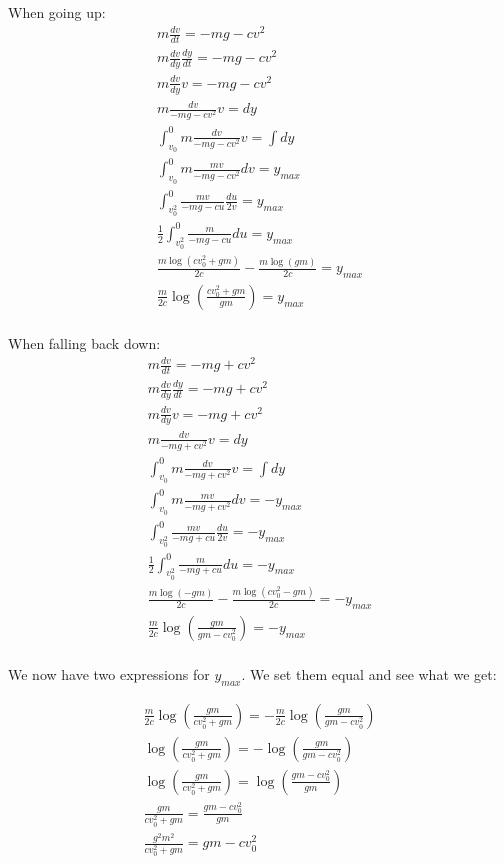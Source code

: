 \documentclass[10pt]{article} %
\begin{document}
When going up:\\
\begin{align}
  m\frac{dv}{dt} = -mg - cv^2\\
  m\frac{dv}{dy}\frac{dy}{dt} = -mg - cv^2\\
  m\frac{dv}{dy}v = -mg - cv^2\\
  m\frac{dv}{-mg - cv^2}v = dy\\
  \int_{v_0}^0 m\frac{dv}{-mg - cv^2}v = \int dy\\
  \int_{v_0}^0 m\frac{mv}{-mg - cv^2}dv = y_{max}\\
  \int_{v_0^2}^0 \frac{mv}{-mg - cu}\frac{du}{2v} = y_{max}\\
  \frac{1}{2} \int_{v_0^2}^0 \frac{m}{-mg - cu} du = y_{max}\\
  \frac{m \log(cv_0^2 + gm)}{2c} - \frac{m \log(gm)}{2c} = y_{max}\\
  \frac{m}{2c} \log(\frac{cv_0^2 + gm}{gm}) = y_{max}\\  
\end{align}


When falling back down:\\
\begin{align}
  m\frac{dv}{dt} = -mg + cv^2\\
  m\frac{dv}{dy}\frac{dy}{dt} = -mg + cv^2\\
  m\frac{dv}{dy}v = -mg + cv^2\\
  m\frac{dv}{-mg + cv^2}v = dy\\
  \int_{v_0}^0 m\frac{dv}{-mg + cv^2}v = \int dy\\
  \int_{v_0}^0 m\frac{mv}{-mg + cv^2}dv = -y_{max}\\
  \int_{v_0^2}^0 \frac{mv}{-mg + cu}\frac{du}{2v} = -y_{max}\\
  \frac{1}{2} \int_{v_0^2}^0 \frac{m}{-mg + cu} du = -y_{max}\\
  \frac{m \log(-gm)}{2c} - \frac{m \log(cv_0^2 - gm)}{2c} = -y_{max}\\
  \frac{m}{2c} \log(\frac{gm}{gm - cv_0^2}) = -y_{max}\\
\end{align}

We now have two expressions for $y_{max}$. We set them equal and see what we get:

\begin{align}
  \frac{m}{2c} \log(\frac{gm}{cv_0^2 + gm}) = -\frac{m}{2c} \log(\frac{gm}{gm - cv_0^2})\\
  \log(\frac{gm}{cv_0^2 + gm}) = -\log(\frac{gm}{gm - cv_0^2})\\
  \log(\frac{gm}{cv_0^2 + gm}) = \log(\frac{gm - cv_0^2}{gm})\\
  \frac{gm}{cv_0^2 + gm} = \frac{gm - cv_0^2}{gm}\\
  \frac{g^2m^2}{cv_0^2 + gm} = gm - cv_0^2\\    
\end{align}
\end{document}
